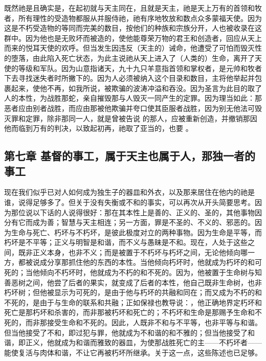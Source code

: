 既然祂是且确实是，在起初就与天主同在，且就是天主，祂是天上万有的首领和牧者，所有理性的受造物都服从并服侍祂，祂有序地牧放和数点众多蒙福天使。因为这是不朽受造物的等同而完美的数目，按他们的种族和宗族分开，人也被收录在这群中。因为他也是无败坏而被造的，使他能尊荣万物的君王和创造者，回应从天上而来的悦耳天使的欢呼。但当发生因违反（天主的）诫命，他遭受了可怕而毁灭性的堕落，由此陷入死亡状态，为此主说祂从天上进入了（人类的）生命，离开了天使的等级和军队。因为山意指诸天，九十九只羊意指首领和掌权者，是元帅和牧者下去寻找迷失者时所撇下的。因为人必须被纳入这个目录和数目，主将他举起并包裹起来，使他不再，如我所说，被欺骗的波涛冲溢和吞没。因为圣言为此目的取了人的本性，为战胜那蛇，亲自摧毁那与人毁灭一同产生的定罪。因为理当如此：那恶者应由别者战胜，而应由那被他欺骗并夸口使其臣服者战胜，因为别无他法可毁灭罪和定罪，除非那同一人，就是曾被告说  的那人，应被重新创造，并撤销那因他而临到万有的判决，以致起初再，祂取了亚当的，也要 。\par


\subsection{第七章 基督的事工，属于天主也属于人，那独一者的事工}

现在我们似乎已对人如何成为独生子的器皿和外衣，以及那来居住在他内的祂是谁，说得足够多了。但关于没有失衡或不和的事实，可以再次从开头简要思考。因为那位说以下话的人说得很好：那在其本性上是善的、正义的、圣的，其他事物因分有它而成为善；智慧与天主相连；另一方面，罪是不圣的、不义的、邪恶的。因为生命与死亡、朽坏与不朽坏，是彼此极度对立的两种事物。因为生命是平等，而朽坏是不平等；正义与明智是和谐，而不义与愚昧是不和。现在，人处于这些之间，既非正义本身，也非不义；而是被置于不朽坏与朽坏之间，无论他倾向哪一方，都被说成分享那抓住他的东西的本性。当他倾向朽坏时，他就成为朽坏的和可死的；当他倾向不朽坏时，他就成为不朽的和不死的。因为，他被置于生命树与知善恶树之间，他尝了后者的果实，就变成了后者的本性，他自己既非生命树，也非朽坏树；但他被显示为可死的，是由于他与朽坏的共融和同在；而又成为不朽的和不死的，是由于与生命的联系和共融；正如保禄也教导说：，他正确地界定朽坏和死亡是那朽坏和杀害的，而非那被朽坏和死亡的；不朽坏和生命是那赐予生命和不死的，而非那接受生命和不死的。因此，人既非不和与不平等，也非平等与和谐。但当他接受了不和，即过犯与罪，他就成为不和谐的和不雅的；但当他接受了和谐，即正义，他就成为和谐而雅致的器皿，为使那战胜死亡的主——不朽坏者——能使复活与肉体和谐，不让它再被朽坏所继承。关于这一点，这些陈述也已足够。\par

